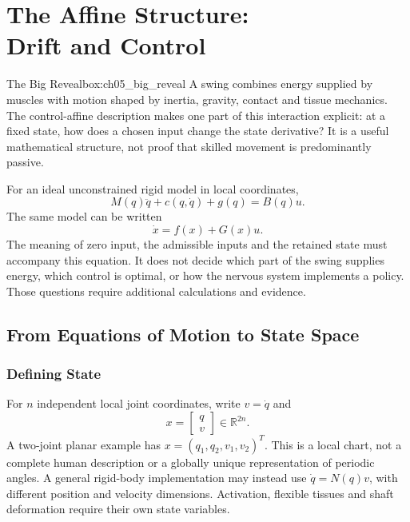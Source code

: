 \chapter[The Affine Structure: Drift and Control]{The Affine Structure:\\Drift and Control}
\raggedbottom
\label{ch:05_affine_structure}

\begin{laymansbox}{The Big Reveal}{box:ch05_big_reveal}
A swing combines energy supplied by muscles with motion shaped by inertia, gravity, contact and tissue mechanics. The control-affine description makes one part of this interaction explicit: at a fixed state, how does a chosen input change the state derivative? It is a useful mathematical structure, not proof that skilled movement is predominantly passive.

For an ideal unconstrained rigid model in local coordinates,
\begin{equation}
 M(q)\ddot q+c(q,\dot q)+g(q)=B(q)u.
\label{eq:ch05_manipulator_repeat}
\end{equation}
The same model can be written
\begin{equation}
 \dot x=f(x)+G(x)u.
\label{eq:ch05_affine_repeat}
\end{equation}
The meaning of zero input, the admissible inputs and the retained state must accompany this equation. It does not decide which part of the swing supplies energy, which control is optimal, or how the nervous system implements a policy. Those questions require additional calculations and evidence.
\end{laymansbox}

\section{From Equations of Motion to State Space}
\subsection*{Defining State}
For $n$ independent local joint coordinates, write $v=\dot q$ and
\begin{equation}
 x=\begin{bmatrix}q\\v\end{bmatrix}\in\mathbb R^{2n}.
\label{eq:ch05_state_def}
\end{equation}
A two-joint planar example has $x=(q_1,q_2,v_1,v_2)^T$. This is a local chart, not a complete human description or a globally unique representation of periodic angles. A general rigid-body implementation may instead use $\dot q=N(q)v$, with different position and velocity dimensions. Activation, flexible tissues and shaft deformation require their own state variables.

